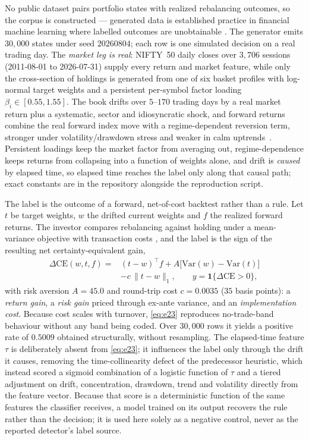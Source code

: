 No public dataset pairs portfolio states with realized rebalancing outcomes,
so the corpus is constructed --- generated data is established practice in
financial machine learning where labelled outcomes are unobtainable
\cite{mashrur2020}. The generator emits $30{,}000$ states under seed
$20260804$; each row is one simulated decision on a real trading day. The
\emph{market leg is real}: NIFTY~50 daily closes over $3{,}706$ sessions
(2011-08-01 to 2026-07-31) supply every return and market feature, while only
the cross-section of holdings is generated from one of six basket profiles
with log-normal target weights and a persistent per-symbol factor loading
$\beta_i\in[0.55,1.55]$. The book drifts over $5$--$170$ trading days by a
real market return plus a systematic, sector and idiosyncratic shock, and
forward returns combine the real forward index move with a regime-dependent
reversion term, stronger under volatility/drawdown stress and weaker in calm
uptrends~\cite{jegadeesh1993}. Persistent loadings keep the market factor from
averaging out, regime-dependence keeps returns from collapsing into a function
of weights alone, and drift is \emph{caused} by elapsed time, so elapsed time
reaches the label only along that causal path; exact constants are in the
repository alongside the reproduction script.

The label is the outcome of a forward, net-of-cost backtest rather than a
rule. Let $t$ be target weights, $w$ the drifted current weights and $f$ the
realized forward returns. The investor compares rebalancing against holding
under a mean-variance objective with transaction costs
\cite{markowitz1952,sharpe1966}, and the label is the sign of the resulting net
certainty-equivalent gain,
\begin{equation}\label{eq:e23}
\begin{aligned}
\Delta\mathrm{CE}(w,t,f) ={}& (t-w)^{\!\top} f
+ A\bigl[\mathrm{Var}(w)-\mathrm{Var}(t)\bigr] \\
&- c\,\lVert t-w \rVert_1,\qquad
y = \mathbf{1}\{\Delta\mathrm{CE} > 0\},
\end{aligned}
\end{equation}
with risk aversion $A{=}45.0$ and round-trip cost $c{=}0.0035$ ($35$ basis
points): a \emph{return gain}, a \emph{risk gain} priced through ex-ante
variance, and an \emph{implementation cost}. Because cost scales with
turnover, \eqref{eq:e23} reproduces no-trade-band behaviour without any band
being coded. Over $30{,}000$ rows it yields a positive rate of $0.5009$
obtained structurally, without resampling. The elapsed-time feature $\tau$ is
deliberately absent from \eqref{eq:e23}; it influences the label only through
the drift it causes, removing the time-collinearity defect of the predecessor
heuristic, which instead scored a sigmoid combination of a logistic function
of $\tau$ and a tiered adjustment on drift, concentration, drawdown, trend and
volatility directly from the feature vector. Because that score is a
deterministic function of the same features the classifier receives, a model
trained on its output recovers the rule rather than the decision; it is used
here solely as a negative control, never as the reported detector's label
source.

